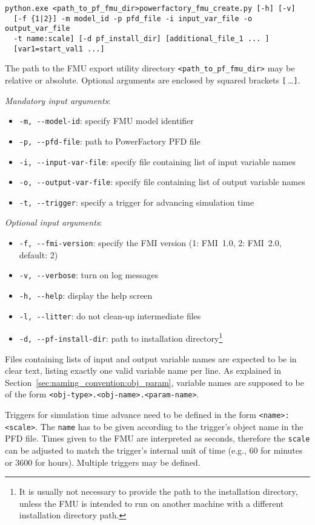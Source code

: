 \begin{verbatim}
python.exe <path_to_pf_fmu_dir>powerfactory_fmu_create.py [-h] [-v]
  [-f {1|2}] -m model_id -p pfd_file -i input_var_file -o output_var_file
  -t name:scale] [-d pf_install_dir] [additional_file_1 ... ]
  [var1=start_val1 ...]
\end{verbatim}

The path to the \fmipp \pf FMU export utility directory \verb!<path_to_pf_fmu_dir>! may be relative or absolute.
Optional arguments are enclosed by squared brackets \verb![!$\,$\ldots\verb!]!.
  
\textit{Mandatory input arguments}:
\begin{itemize}
  \item \verb!-m, --model-id!: specify FMU model identifier
  \item \verb!-p, --pfd-file!: path to PowerFactory PFD file
  \item \verb!-i, --input-var-file!: specify file containing list of input variable names
  \item \verb!-o, --output-var-file!: specify file containing list of output variable names
  \item \verb!-t, --trigger!: specify a trigger for advancing simulation time
\end{itemize}
\textit{Optional input arguments}:
\begin{itemize}
  \item \verb!-f, --fmi-version!: specify the FMI version (1: FMI~1.0, 2: FMI~2.0, default: 2)
  \item \verb!-v, --verbose!: turn on log messages
  \item \verb!-h, --help!: display the help screen
  \item \verb!-l, --litter!: do not clean-up intermediate files
  \item \verb!-d, --pf-install-dir!: path to \pf installation directory\footnote{It is usually not necessary to provide the path to the \pf installation directory, unless the FMU is intended to run on another machine with a different installation directory path.}
\end{itemize}
Files containing lists of input and output variable names are expected to be in clear text, listing exactly one valid variable name per line.
As explained in Section~\ref{sec:naming_convention:obj_param}, variable names are supposed to be of the  form \texttt{<obj-type>.<obj-name>.<param-name>}.

Triggers for simulation time advance need to be defined in the form \texttt{<name>:<scale>}.
The \texttt{name} has to be given according to the trigger's object name in the PFD file.
Times given to the FMU are interpreted as seconds, therefore the \texttt{scale} can be adjusted to match the trigger's internal unit of time (e.g., 60 for minutes or 3600 for hours).
Multiple triggers may be defined.

